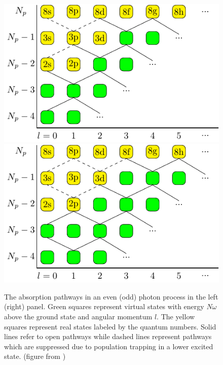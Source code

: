 \begin{figure}[!ht]
\centering
\includegraphics[width=0.49\columnwidth]{figs/Rydberg/l_fig_even.pdf}
\includegraphics[width=0.49\columnwidth]{figs/Rydberg/l_fig_odd.pdf}
\caption{
The absorption pathways in an even (odd) photon process in the left (right) panel. Green squares represent virtual states with energy $N\omega$ above the ground state and angular momentum $l$. The yellow squares represent real states labeled by the quantum numbers. Solid lines refer to open pathways while dashed lines represent pathways which are suppressed due to population trapping in a lower excited state. (figure from \cite{venzke2018_ryd})
}
\label{fig:pathways_ryd_linear}
\end{figure}

